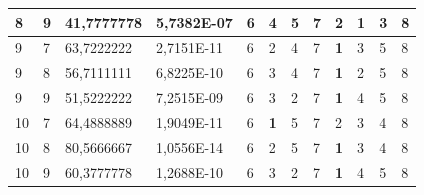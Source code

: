 \documentclass[conference]{IEEEtran}
\begin{document}
\begin{table}[]
\begin{tabular}{|llll|llllllll|}
		\multicolumn{1}{|l|}{8}   & \multicolumn{1}{l|}{9}         & \multicolumn{1}{l|}{41,7777778}    & 5,7382E-07 & \multicolumn{1}{l|}{6}   & \multicolumn{1}{l|}{4}          & \multicolumn{1}{l|}{5}          & \multicolumn{1}{l|}{7}   & \multicolumn{1}{l|}{2}          & \multicolumn{1}{l|}{\textbf{1}} & \multicolumn{1}{l|}{3}          & 8                      \\ \hline
		\multicolumn{1}{|l|}{9}   & \multicolumn{1}{l|}{7}         & \multicolumn{1}{l|}{63,7222222}    & 2,7151E-11 & \multicolumn{1}{l|}{6}   & \multicolumn{1}{l|}{2}          & \multicolumn{1}{l|}{4}          & \multicolumn{1}{l|}{7}   & \multicolumn{1}{l|}{\textbf{1}} & \multicolumn{1}{l|}{3}          & \multicolumn{1}{l|}{5}          & 8                      \\ \hline
		\multicolumn{1}{|l|}{9}   & \multicolumn{1}{l|}{8}         & \multicolumn{1}{l|}{56,7111111}    & 6,8225E-10 & \multicolumn{1}{l|}{6}   & \multicolumn{1}{l|}{3}          & \multicolumn{1}{l|}{4}          & \multicolumn{1}{l|}{7}   & \multicolumn{1}{l|}{\textbf{1}} & \multicolumn{1}{l|}{2}          & \multicolumn{1}{l|}{5}          & 8                      \\ \hline
		\multicolumn{1}{|l|}{9}   & \multicolumn{1}{l|}{9}         & \multicolumn{1}{l|}{51,5222222}    & 7,2515E-09 & \multicolumn{1}{l|}{6}   & \multicolumn{1}{l|}{3}          & \multicolumn{1}{l|}{2}          & \multicolumn{1}{l|}{7}   & \multicolumn{1}{l|}{\textbf{1}} & \multicolumn{1}{l|}{4}          & \multicolumn{1}{l|}{5}          & 8                      \\ \hline
		\multicolumn{1}{|l|}{10}  & \multicolumn{1}{l|}{7}         & \multicolumn{1}{l|}{64,4888889}    & 1,9049E-11 & \multicolumn{1}{l|}{6}   & \multicolumn{1}{l|}{\textbf{1}} & \multicolumn{1}{l|}{5}          & \multicolumn{1}{l|}{7}   & \multicolumn{1}{l|}{2}          & \multicolumn{1}{l|}{3}          & \multicolumn{1}{l|}{4}          & 8                      \\ \hline
		\multicolumn{1}{|l|}{10}  & \multicolumn{1}{l|}{8}         & \multicolumn{1}{l|}{80,5666667}    & 1,0556E-14 & \multicolumn{1}{l|}{6}   & \multicolumn{1}{l|}{2}          & \multicolumn{1}{l|}{5}          & \multicolumn{1}{l|}{7}   & \multicolumn{1}{l|}{\textbf{1}} & \multicolumn{1}{l|}{3}          & \multicolumn{1}{l|}{4}          & 8                      \\ \hline
		\multicolumn{1}{|l|}{10}  & \multicolumn{1}{l|}{9}         & \multicolumn{1}{l|}{60,3777778}    & 1,2688E-10 & \multicolumn{1}{l|}{6}   & \multicolumn{1}{l|}{3}          & \multicolumn{1}{l|}{2}          & \multicolumn{1}{l|}{7}   & \multicolumn{1}{l|}{\textbf{1}} & \multicolumn{1}{l|}{4}          & \multicolumn{1}{l|}{5}          & 8                      \\ \hline

\end{tabular}
\end{table}
\end{document}
